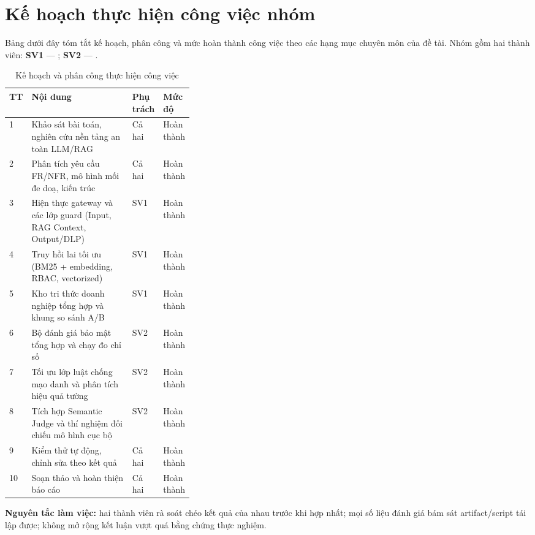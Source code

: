 \chapter*{Kế hoạch thực hiện công việc nhóm}
\setlength{\parskip}{6pt}

Bảng dưới đây tóm tắt kế hoạch, phân công và mức hoàn thành công việc theo các hạng mục chuyên môn của đề tài. Nhóm gồm hai thành viên: \textbf{SV1} --- \studentname{}; \textbf{SV2} --- \studentnametwo{}.

\begin{table}[H]
\centering
\caption{Kế hoạch và phân công thực hiện công việc}
\label{tab:ke-hoach-nhom}
\begin{tabularx}{\linewidth}{@{}p{0.04\linewidth}X p{0.16\linewidth}p{0.15\linewidth}@{}}
\toprule
\textbf{TT} & \textbf{Nội dung} & \textbf{Phụ trách} & \textbf{Mức độ} \\
\midrule
1 & Khảo sát bài toán, nghiên cứu nền tảng an toàn LLM/RAG & Cả hai & Hoàn thành \\
2 & Phân tích yêu cầu FR/NFR, mô hình mối đe doạ, kiến trúc & Cả hai & Hoàn thành \\
3 & Hiện thực gateway và các lớp guard (Input, RAG Context, Output/DLP) & SV1 & Hoàn thành \\
4 & Truy hồi lai tối ưu (BM25 + embedding, RBAC, vectorized) & SV1 & Hoàn thành \\
5 & Kho tri thức doanh nghiệp tổng hợp và khung so sánh A/B & SV1 & Hoàn thành \\
6 & Bộ đánh giá bảo mật tổng hợp và chạy đo chỉ số & SV2 & Hoàn thành \\
7 & Tối ưu lớp luật chống mạo danh và phân tích hiệu quả tường & SV2 & Hoàn thành \\
8 & Tích hợp Semantic Judge và thí nghiệm đối chiếu mô hình cục bộ & SV2 & Hoàn thành \\
9 & Kiểm thử tự động, chỉnh sửa theo kết quả & Cả hai & Hoàn thành \\
10 & Soạn thảo và hoàn thiện báo cáo & Cả hai & Hoàn thành \\
\bottomrule
\end{tabularx}
\end{table}

\textbf{Nguyên tắc làm việc:} hai thành viên rà soát chéo kết quả của nhau trước khi hợp nhất; mọi số liệu đánh giá bám sát artifact/script tái lập được; không mở rộng kết luận vượt quá bằng chứng thực nghiệm.
